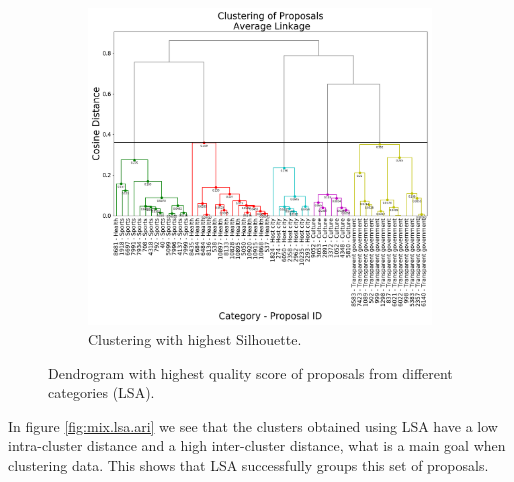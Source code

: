 \begin{figure}[!htpb]\ContinuedFloat
 \centering 
\begin{subfigure}[b]{0.55\textwidth}  
  \includegraphics[width=\textwidth]{lsa/BEST_SIL_MIX.png}
  \caption[]%
  {{\small Clustering with highest Silhouette.}}    
  \label{fig:mix.lsa.sil}
  \end{subfigure}
\caption{Dendrogram with highest quality score of proposals from different categories (LSA).}
\label{fig:mix.lsa.dendro}
\end{figure}

In figure \ref{fig:mix.lsa.ari} we see that the clusters obtained using LSA have a low intra-cluster distance and a high inter-cluster distance, what is a main goal when clustering data. This shows that LSA successfully groups this set of proposals.
\FloatBarrier
